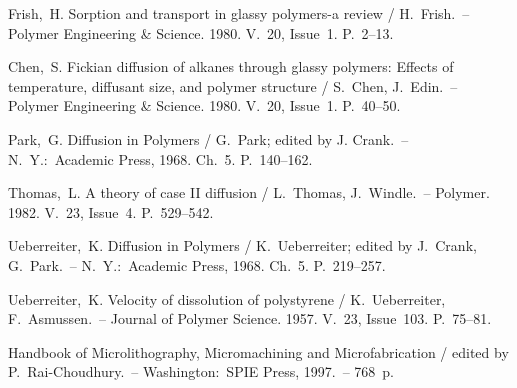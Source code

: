 \begin{thebibliography}{99}
 Frish,~H. Sorption and transport in glassy polymers-a review /
H.~Frish.~-- Polymer Engineering \& Science. 1980. V.~20, Issue~1. P.~2--13.

 Chen,~S. Fickian diffusion of alkanes through glassy polymers:
Effects of temperature, diffusant size, and polymer structure / S.~Chen,
J.~Edin.~-- Polymer Engineering \& Science. 1980. V.~20, Issue~1. P.~40--50.

 Park,~G. Diffusion in Polymers / G.~Park; edited by J. Crank.~--
N.~Y.:~Academic Press, 1968. Ch.~5. P.~140--162.

 Thomas,~L. A theory of case II diffusion / L.~Thomas,
J.~Windle.~-- Polymer. 1982. V.~23, Issue~4. P.~529--542.

 Ueberreiter,~K. Diffusion in Polymers / K.~Ueberreiter; edited by
J.~Crank, G.~Park.~-- N.~Y.:~Academic Press, 1968. Ch.~5. P.~219--257.

 Ueberreiter,~K. Velocity of dissolution of polystyrene /
K.~Ueberreiter, F.~Asmussen.~-- Journal of Polymer Science. 1957. V.~23,
Issue~103. P.~75--81.

 Handbook of Microlithography, Micromachining and Microfabrication
/ edited by P.~Rai-Choudhury.~-- Washington:~SPIE Press, 1997.~-- 768~p.

\end{thebibliography}
